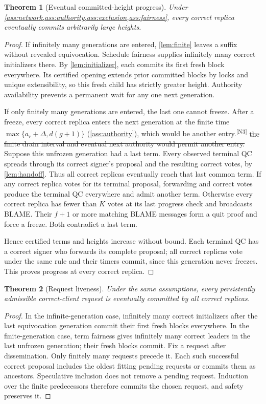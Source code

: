 \documentclass[11pt,a4paper]{article}
\newcommand{\NEW}[1]{{\color{diffNew}#1}}
\newcommand{\DEL}[1]{{\color{diffDel}\sout{#1}}}
\newcommand{\CH}[1]{\textsuperscript{\color{diffNew}\sffamily\scriptsize[#1]}}
\newcommand{\NEW}[1]{#1}
\newcommand{\DEL}[1]{}
\newcommand{\CH}[1]{}
\newtheorem{theorem}[theorem]{Theorem}
\begin{document}
\begin{theorem}[Eventual committed-height progress]
\label{thm:height}
Under \cref{ass:network,ass:authority,ass:exclusion,ass:fairness}, every
correct replica eventually commits arbitrarily large heights.
\end{theorem}
\begin{proof}
If infinitely many generations are entered, \cref{lem:finite} leaves a
suffix without revealed equivocation. Schedule fairness supplies infinitely
many correct initializers there. By \cref{lem:initializer}, each commits
its first fresh block everywhere. Its certified opening extends prior
committed blocks by locks and unique extensibility, so this fresh child
has strictly greater height. Authority availability prevents a permanent
wait for any one next generation.

If only finitely many generations are entered, the last one cannot freeze.
\NEW{After a freeze, every correct replica enters the next generation at
the finite time $\max\{a_r+\Delta,d(g+1)\}$ (\cref{ass:authority}), which
would be another entry.}\CH{N3} \DEL{the finite drain interval and
eventual next authority would permit another entry.}
Suppose this unfrozen generation had a last term. Every observed
terminal QC spreads through its \NEW{correct} signer's proposal and the
resulting correct votes, by \cref{lem:handoff}. Thus all correct replicas
eventually reach that last common term. If any correct replica votes for
its terminal proposal, forwarding and correct votes produce the terminal
QC everywhere and admit another term. Otherwise every correct replica has
fewer than $K$ votes at its last progress check and broadcasts BLAME.
Their \NEW{$f+1$ or more matching BLAME messages form a quit proof and}
force a freeze. Both contradict a last term.

Hence certified terms and heights increase without bound. Each terminal
QC has a correct signer who forwards its complete proposal; all correct
replicas vote under the same rule and their timers commit, since this
generation never freezes. This proves progress at every correct replica.
\end{proof}

\begin{theorem}[Request liveness]
\label{thm:requests}
Under the same assumptions, every persistently admissible correct-client
request is eventually committed by all correct replicas.
\end{theorem}
\begin{proof}
In the infinite-generation case, infinitely many correct initializers
after the last equivocation generation commit their first fresh blocks
everywhere. In the finite-generation case, term fairness gives infinitely
many correct leaders in the last unfrozen generation; their fresh blocks
commit. Fix a request after dissemination. Only finitely many requests
precede it. Each such successful correct proposal includes the oldest
fitting pending requests or commits them as ancestors. Speculative
inclusion does not remove a pending request. Induction over the finite
predecessors therefore commits the chosen request, and safety preserves it.
\end{proof}
\end{document}
